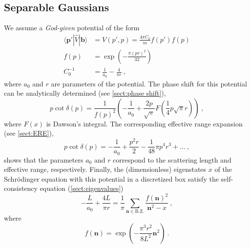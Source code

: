 \documentclass[11pt]{article}
\begin{document}
\subsection{Separable Gaussians}

We assume a \emph{God-given} potential of the form
\begin{align}
\langle \bm p'|\hat V|\bm b\rangle &=V(p',p)= \frac{4\pi C_0}{m}f(p')f(p)\label{eqn:god potential}\\
f(p)&=\exp\left(-\frac{\pi (pr)^2}{32}\right)\nonumber\\
C_0^{-1}&=\frac{1}{a_0}-\frac{4}{\pi  r}\nonumber\ ,
\end{align}
where $a_0$ and $r$ are parameters of the potential.
The phase shift for this potential can be analytically determined (see \autoref{sect:phase shift}), 
\begin{equation}
p\cot\delta(p)=\frac{1}{f(p)^2}\left(-\frac{1}{a_0}+\frac{2 p}{\sqrt{\pi}} F\left(\frac{1}{4} p \sqrt{\pi } r\right)\right)\ ,
\end{equation}
where $F(x)$ is Dawson's integral.  The corresponding effective range expansion (see \autoref{sect:ERE}),
\begin{equation}
p\cot\delta(p)=-\frac{1}{a_0}+\frac{p^2 r}{2}-\frac{1}{48} \pi  p^4 r^3+\ldots\ ,
\end{equation}
shows that the parameters $a_0$ and $r$ correspond to the scattering length and effective range, respectively.  Finally, the (dimensionless) eigenstates $x$ of the Schr\"odinger equation with this potential in a discretized box satisfy the self-consistency equation (\autoref{sect:eigenvalues})
\begin{equation}\label{eqn:SE}
-\frac{L}{a_0}+\frac{4L}{\pi  r}=\frac{1}{\pi}\sum_{\bm n\in\mathrm{B.Z.}}\frac{f\left(\bm n\right)^2}{\bm n^2-x}\ ,
\end{equation}
where
\begin{equation}
f(\bm n)=\exp\left(-\frac{\pi ^3  r^2}{8 L^2}\bm n^2\right)\ .
\end{equation}
\end{document}
